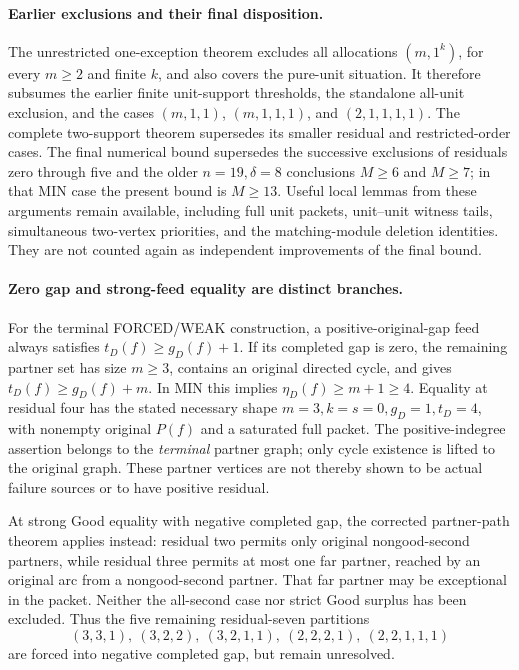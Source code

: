 \paragraph{Earlier exclusions and their final disposition.}
The unrestricted one-exception theorem excludes all allocations
\((m,1^k)\), for every \(m\ge2\) and finite \(k\), and also covers the
pure-unit situation. It therefore subsumes the earlier finite unit-support
thresholds, the standalone all-unit exclusion, and the cases
\((m,1,1)\), \((m,1,1,1)\), and \((2,1,1,1,1)\).
The complete two-support theorem supersedes its smaller residual and
restricted-order cases. The final numerical bound supersedes the
successive exclusions of residuals zero through five and the older
\(n=19,\delta=8\) conclusions \(M\ge6\) and \(M\ge7\); in that
MIN case the present bound is \(M\ge13\). Useful local lemmas from
these arguments remain available, including full unit packets,
unit--unit witness tails, simultaneous two-vertex priorities, and the
matching-module deletion identities. They are not counted again as
independent improvements of the final bound.

\paragraph{Zero gap and strong-feed equality are distinct branches.}
For the terminal FORCED/WEAK construction, a positive-original-gap feed
always satisfies \(t_D(f)\ge g_D(f)+1\). If its completed gap is zero,
the remaining partner set has size \(m\ge3\), contains an original
directed cycle, and gives
\(t_D(f)\ge g_D(f)+m\). In MIN this implies
\(\eta_D(f)\ge m+1\ge4\). Equality at residual four has the stated
necessary shape \(m=3,k=s=0,g_D=1,t_D=4\), with nonempty original
\(P(f)\) and a saturated full packet. The positive-indegree assertion
belongs to the \emph{terminal} partner graph; only cycle existence is
lifted to the original graph. These partner vertices are not thereby
shown to be actual failure sources or to have positive residual.

At strong Good equality with negative completed gap, the corrected
partner-path theorem applies instead: residual two permits only original
nongood-second partners, while residual three permits at most one far
partner, reached by an original arc from a nongood-second partner. That
far partner may be exceptional in the packet. Neither the all-second
case nor strict Good surplus has been excluded. Thus the five remaining
residual-seven partitions
\[
 (3,3,1),\ (3,2,2),\ (3,2,1,1),\
 (2,2,2,1),\ (2,2,1,1,1)
\]
are forced into negative completed gap, but remain unresolved.

